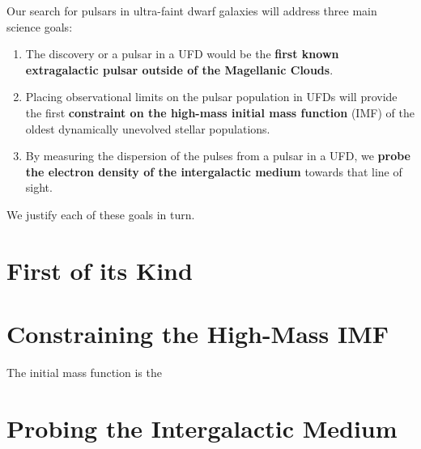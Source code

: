 Our search for pulsars in ultra-faint dwarf galaxies will address three main science goals:
\begin{enumerate}
\item The discovery or a pulsar in a UFD would be the \textbf{first known extragalactic pulsar outside of the Magellanic Clouds}.
\item Placing observational limits on the pulsar population in UFDs will provide the first \textbf{constraint on the high-mass initial mass function} (IMF) of the oldest dynamically unevolved stellar populations.
\item By measuring the dispersion of the pulses from a pulsar in a UFD, we \textbf{probe the electron density of the intergalactic medium} towards that line of sight.
\end{enumerate}
We justify each of these goals in turn.

\section{First of its Kind}


\section{Constraining the High-Mass IMF}
The initial mass function is the


\section{Probing the Intergalactic Medium}

